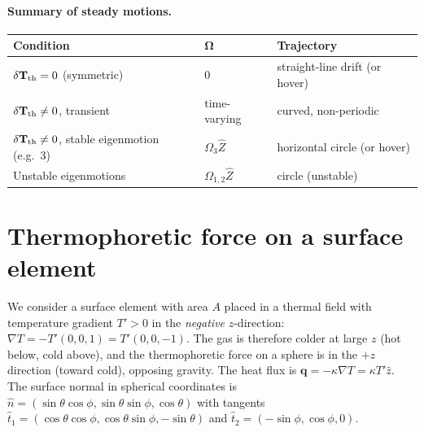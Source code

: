 \documentclass[11pt]{article}
\newcommand{\chg}[1]{\marginpar{\raggedright\footnotesize\textcolor{red!70!black}{\textsf{#1}}}}
\newcommand{\vect}[1]{\bm{#1}}
\begin{document}
\paragraph{Summary of steady motions.}
\begin{center}
\begin{tabular}{lll}
\toprule
Condition & $\vect\Omega$ & Trajectory\\
\midrule
$\delta\mathbf T_{\rm th}=0$ (symmetric) & 0 & straight-line drift (or hover)\\
$\delta\mathbf T_{\rm th}\neq0$, transient & time-varying & curved, non-periodic\\
$\delta\mathbf T_{\rm th}\neq0$, stable eigenmotion (e.g.\ 3) & $\Omega_3\hat Z$ & horizontal circle (or hover)\\
Unstable eigenmotions & $\Omega_{1,2}\hat Z$ & circle (unstable)\\
\bottomrule
\end{tabular}
\end{center}

\section{Thermophoretic force on a surface element}
We consider a surface element with area $A$ placed in a thermal field with temperature gradient $T'>0$ in the \emph{negative} $z$-direction: $\nabla T=-T'(0,0,1)=T'(0,0,-1)$. The gas is therefore colder at large $z$ (hot below, cold above),\chg{C4} and the thermophoretic force on a sphere is in the $+z$ direction (toward cold), opposing gravity. The heat flux is $\vect q=-\kappa\nabla T=\kappa T'\hat z$. The surface normal in spherical coordinates is $\hat n=(\sin\theta\cos\phi,\sin\theta\sin\phi,\cos\theta)$ with tangents $\hat t_1=(\cos\theta\cos\phi,\cos\theta\sin\phi,-\sin\theta)$ and $\hat t_2=(-\sin\phi,\cos\phi,0)$.
\end{document}
